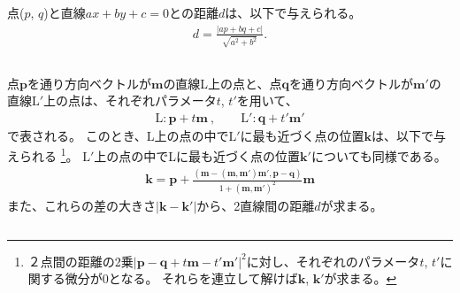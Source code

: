 




\begin{Column}{}
点($p$, $q$)と直線$ax+by+c=0$との距離$d$は、以下で与えられる。
\begin{align*}
  d = \frac{|ap+bq+c|}{\sqrt{a^2+b^2}}.
\end{align*}
\end{Column}
\begin{Column}{}
点$\boldsymbol p$を通り方向ベクトルが$\boldsymbol m$の直線L上の点と、点$\boldsymbol q$を通り方向ベクトルが$\boldsymbol m'$の直線$\mathrm L'$上の点は、それぞれパラメータ$t$, $t'$を用いて、
\begin{align*}
  \mathrm L: \boldsymbol p+t\boldsymbol m\ , \qquad
  \mathrm L': \boldsymbol q+t'\boldsymbol m'
\end{align*}
で表される。
このとき、L上の点の中で$\mathrm L'$に最も近づく点の位置$\boldsymbol k$は、以下で与えられる
\footnote{２点間の距離の2乗$|\boldsymbol p-\boldsymbol q+t\boldsymbol m-t'\boldsymbol m'|^2$に対し、それぞれのパラメータ$t$, $t'$に関する微分が0となる。
それらを連立して解けば$\boldsymbol k$, $\boldsymbol k'$が求まる。}。
$\mathrm L'$上の点の中でLに最も近づく点の位置$\boldsymbol k'$についても同様である。
\begin{align*}
  \boldsymbol k
  = \boldsymbol p
    +\frac{(\boldsymbol m-(\boldsymbol m, \boldsymbol m')\boldsymbol m', \boldsymbol p-\boldsymbol q)}
          {1+(\boldsymbol m, \boldsymbol m')^2}\boldsymbol m
\end{align*}
また、これらの差の大きさ$|\boldsymbol k-\boldsymbol k'|$から、2直線間の距離$d$が求まる。
\end{Column}
